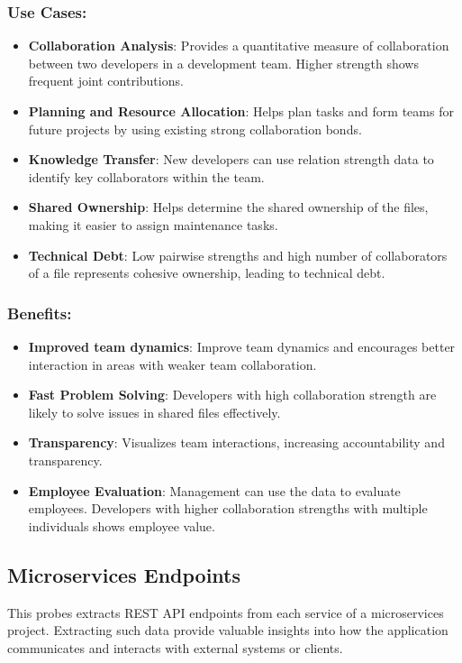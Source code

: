 \subsubsection{Use Cases:}
\begin{itemize}[label=$\bullet$]
	\item \textbf{Collaboration Analysis}: Provides a quantitative measure of collaboration between two developers in a development team. Higher strength shows frequent joint contributions.
	\item \textbf{Planning and Resource Allocation}: Helps plan tasks and form teams for future projects by using existing strong collaboration bonds.
	\item \textbf{Knowledge Transfer}: New developers can use relation strength data to identify key collaborators within the team.
	\item \textbf{Shared Ownership}: Helps determine the shared ownership of the files, making it easier to assign maintenance tasks.
	\item \textbf{Technical Debt}: Low pairwise strengths and high number of collaborators of a file represents cohesive ownership, leading to technical debt.
\end{itemize}
\subsubsection{Benefits:}
\begin{itemize}[label=$\bullet$]
	\item \textbf{Improved team dynamics}: Improve team dynamics and encourages better interaction in areas with weaker team collaboration.
	\item \textbf{Fast Problem Solving}: Developers with high collaboration strength are likely to solve issues in shared files effectively.
	\item \textbf{Transparency}: Visualizes team interactions, increasing accountability and transparency.
	\item \textbf{Employee Evaluation}: Management can use the data to evaluate employees. Developers with higher collaboration strengths with multiple individuals shows employee value.
\end{itemize} 

\subsection{Microservices Endpoints}
This probes extracts REST API endpoints from each service of a microservices project. Extracting such data provide valuable insights into how the application communicates and interacts with external systems or clients.
